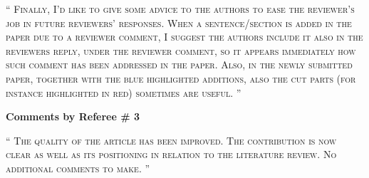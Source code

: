 \documentclass[10pt]{article}
\newcommand{\referee}[1]{\;
  \begin{minipage}[t]{.95\textwidth}
    ``{\small\color{red} \textsc{#1}}''
  \end{minipage}\medskip
  }
\begin{document}
\begin{enumerate}[label={[R3:\,\arabic{enumi}]}]
\item\label{reply:R3:8}
\referee{Finally, I'd like to give some advice to the authors to ease the
reviewer's job in future reviewers' responses. When a sentence/section
is added in the paper due to a reviewer comment, I suggest the authors
include it also in the reviewers reply, under the reviewer comment, so
it appears immediately how such comment has been addressed in the
paper. Also, in the newly submitted paper, together with the blue
highlighted additions, also the cut parts (for instance highlighted in
red) sometimes are useful. }


\end{enumerate}

\hspace*{-25pt} \textbf{\large Comments by Referee \# 3}
\begin{enumerate}[label={[R4:\,\arabic{enumi}]}]

\item\label{reply:R4:1}
\referee{The quality of the article has been improved. The contribution is now
clear as well as its positioning in relation to the literature review.
No additional comments to make.
}


\end{enumerate}

\appendix

% 
\end{document}
